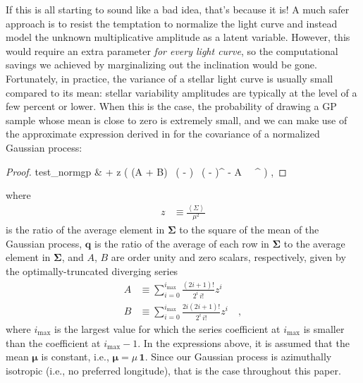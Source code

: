 \documentclass[modern]{aastex62}
\begin{document}
If this is all starting to sound like a bad idea, that's because it is!
A much safer approach is to resist the temptation to normalize the light curve
and instead model the unknown multiplicative amplitude as a latent variable. However,
this would require an extra parameter \emph{for every light curve}, so the
computational savings we achieved by marginalizing out the inclination
would be gone. Fortunately, in practice, the variance of a stellar light curve
is usually small compared to its mean: stellar variability amplitudes are
typically at the level of a few percent or lower. When this is the case,
the probability of drawing a GP sample whose mean is close to zero is
extremely small, and we can make use of the approximate expression derived
in \citet{Luger2021} for the covariance of a normalized Gaussian process:
%
\begin{proof}{test_normgp}
    \label{eq:SigmaTilde}
    \tilde{\pmb{\Sigma}}
    & \approx
     \pmb{\Sigma} +
    z \Big(
    (A + B) \, ( - ) \, ( - )^\top
    - A \,  \, ^\top
    \Big)
    \quad,
\end{proof}
%
where
%
\begin{align}
    \label{eq:z}
    z & \equiv \frac{\left< \Sigma \right>}{\mu^2}
\end{align}
%
is the ratio of the average element in $\pmb{\Sigma}$
to the square of the mean of the Gaussian process,
$\mathbf{q}$ is the ratio of the average of each row in $\pmb{\Sigma}$
to the average element in $\pmb{\Sigma}$, and $A$, $B$ are
order unity and zero scalars, respectively,
given by the optimally-truncated diverging series
%
\begin{align}
    \label{eq:baseline_alpha}
    A
     & \equiv
    \sum\limits_{i=0}^{i_\mathrm{max}}
    \frac{(2i + 1)!}{2^i \, i!}
    z^i
    \\[1em]
    \label{eq:baseline_beta}
    B
     & \equiv
    \sum\limits_{i=0}^{i_\mathrm{max}}
    \frac{2i(2i + 1)!}{2^i \, i!}
    z^i
    \quad,
\end{align}
%
where $i_\mathrm{max}$ is the largest value for which the series coefficient at $i_\mathrm{max}$ is
smaller than the coefficient at $i_\mathrm{max} - 1$. In the expressions above, it is
assumed that the mean $\pmb{\mu}$ is constant, i.e., $\pmb{\mu} = \mu\, \mathbf{1}$.
Since our Gaussian process is azimuthally isotropic (i.e., no preferred
longitude), that is the case throughout this paper.

\end{document}
